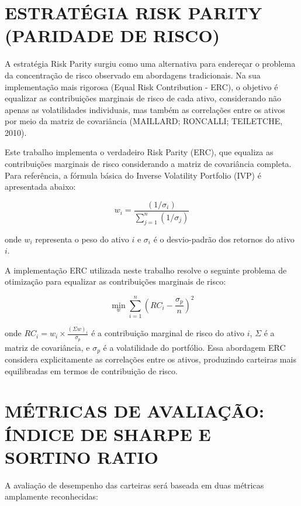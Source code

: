 \section{ESTRATÉGIA RISK PARITY (PARIDADE DE RISCO)}

A estratégia Risk Parity surgiu como uma alternativa para endereçar o problema da concentração de risco observado em abordagens tradicionais. Na sua implementação mais rigorosa (Equal Risk Contribution - ERC), o objetivo é equalizar as contribuições marginais de risco de cada ativo, considerando não apenas as volatilidades individuais, mas também as correlações entre os ativos por meio da matriz de covariância (MAILLARD; RONCALLI; TEILETCHE, 2010).

Este trabalho implementa o verdadeiro Risk Parity (ERC), que equaliza as contribuições marginais de risco considerando a matriz de covariância completa. Para referência, a fórmula básica do Inverse Volatility Portfolio (IVP) é apresentada abaixo:

\begin{equation}
\label{eq:risk_parity}
w_i = \frac{(1/\sigma_i)}{\sum_{j=1}^{n}(1/\sigma_j)}
\end{equation}

onde $w_i$ representa o peso do ativo $i$ e $\sigma_i$ é o desvio-padrão dos retornos do ativo $i$.

A implementação ERC utilizada neste trabalho resolve o seguinte problema de otimização para equalizar as contribuições marginais de risco:

\begin{equation}
\label{eq:erc_optimization}
\min_{w} \sum_{i=1}^{n} \left( RC_i - \frac{\sigma_p}{n} \right)^2
\end{equation}

onde $RC_i = w_i \times \frac{(\Sigma w)_i}{\sigma_p}$ é a contribuição marginal de risco do ativo $i$, $\Sigma$ é a matriz de covariância, e $\sigma_p$ é a volatilidade do portfólio. Essa abordagem ERC considera explicitamente as correlações entre os ativos, produzindo carteiras mais equilibradas em termos de contribuição de risco.

\section{MÉTRICAS DE AVALIAÇÃO: ÍNDICE DE SHARPE E SORTINO RATIO}

A avaliação de desempenho das carteiras será baseada em duas métricas amplamente reconhecidas:

